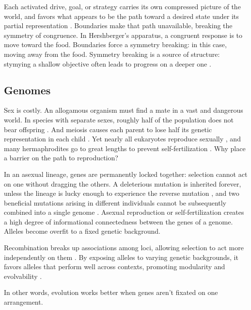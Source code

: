 \documentclass[11pt]{article}
\begin{document}
Each activated drive, goal, or strategy carries its own compressed picture of the world, and favors what appears to be the path toward a desired state under its partial representation \citep{miller1960plans, carver2001self}. Boundaries make that path unavailable, breaking the symmetry of congruence. In Hershberger's apparatus, a congruent response is to move toward the food. Boundaries force a symmetry breaking: in this case, moving away from the food. Symmetry breaking is a source of structure: stymying a shallow objective often leads to progress on a deeper one \citep{anderson1972more, duncker1945on, rosenberg1969direction, stokes2005creativity, ohlsson1992information}.

\subsection{Genomes} 

Sex is costly. An allogamous organism must find a mate in a vast and dangerous world. In species with separate sexes, roughly half of the population does not bear offspring \citep{smith1971origin}. And meiosis causes each parent to lose half its genetic representation in each child \citep{williams1975sex}. Yet nearly all eukaryotes reproduce sexually \citep{speijer2015sex}, and many hermaphrodites go to great lengths to prevent self-fertilization \citep{charlesworth2005plant}. Why place a barrier on the path to reproduction? 

In an asexual lineage, genes are permanently locked together: selection cannot act on one without dragging the others. A deleterious mutation is inherited forever, unless the lineage is lucky enough to experience the reverse mutation \citep{muller1964relation}, and two beneficial mutations arising in different individuals cannot be subsequently combined into a single genome \citep{muller1932some,fisher1930genetical}. Asexual reproduction or self-fertilization creates a high degree of informational connectedness between the genes of a genome. Alleles become overfit to a fixed genetic background. 

Recombination breaks up associations among loci, allowing selection to act more independently on them \citep{felsenstein1974evolutionary}. By exposing alleles to varying genetic backgrounds, it favors alleles that perform well across contexts, promoting modularity and evolvability \citep{livnat2008mixability,livnat2010sex,wagner1996perspective, watson2016can}.

In other words, evolution works better when genes aren't fixated on one arrangement. 
\end{document}
